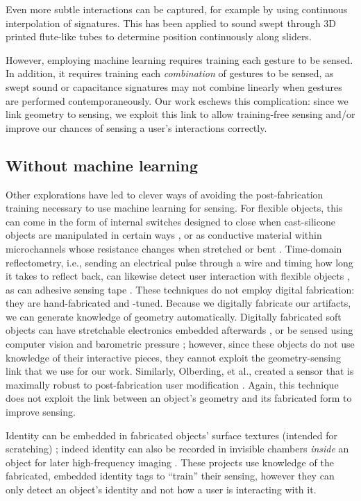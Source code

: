         Even more subtle interactions can be captured, for example by using continuous interpolation of signatures. This has been applied to sound swept through 3D printed flute-like tubes \cite{laput-acoustruments} to determine position continuously along sliders.

        However, employing machine learning requires training each gesture to be sensed. In addition, it requires training each \emph{combination} of gestures to be sensed, as swept sound or capacitance signatures may not combine linearly when gestures are performed contemporaneously. Our work eschews this complication: since we link geometry to sensing, we exploit this link to allow training-free sensing and/or improve our chances of sensing a user's interactions correctly.

    \subsection{Without machine learning}
        Other explorations have led to clever ways of avoiding the post-fabrication training necessary to use machine learning for sensing. For flexible objects, this can come in the form of internal switches designed to close when cast-silicone objects are manipulated in certain ways \cite{slyper-structure}, or as conductive material within microchannels whose resistance changes when stretched or bent \cite{majidi-curvature, park-microchannels}. Time-domain reflectometry, i.e., sending an electrical pulse through a wire and timing how long it takes to reflect back, can likewise detect user interaction with flexible objects \cite{wimmer-tdr}, as can adhesive sensing tape \cite{holman-tactiletape}. These techniques do not employ digital fabrication: they are hand-fabricated and -tuned. Because we digitally fabricate our artifacts, we can generate knowledge of geometry automatically. Digitally fabricated soft objects can have stretchable electronics embedded afterwards \cite{yao-pneui}, or be sensed using computer vision and barometric pressure \cite{harrison-buttons, slyper-pressure}; however, since these objects do not use knowledge of their interactive pieces, they cannot exploit the geometry-sensing link that we use for our work. Similarly, Olberding, et al., created a sensor that is maximally robust to post-fabrication user modification \cite{olberding-cuttable}. Again, this technique does not exploit the link between an object's geometry and its fabricated form to improve sensing.

        Identity can be embedded in fabricated objects' surface textures (intended for scratching) \cite{harrison-acoustic}; indeed identity can also be recorded in invisible chambers \emph{inside} an object for later high-frequency imaging \cite{willis-infrastructs}. These projects use knowledge of the fabricated, embedded identity tags to ``train'' their sensing, however they can only detect an object's identity and not how a user is interacting with it.

